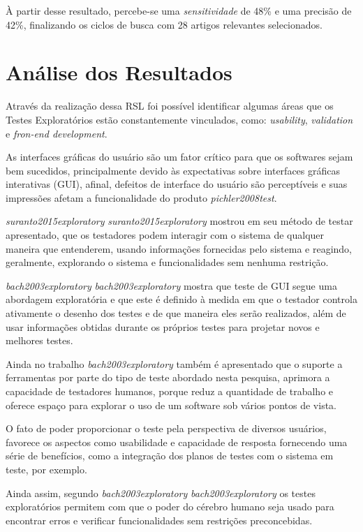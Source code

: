 À partir desse resultado, percebe-se uma \textit{sensitividade} de 48\% e uma precisão de 42\%, finalizando os ciclos de busca com 28 artigos relevantes selecionados.  

\section{Análise dos Resultados}

Através da realização dessa RSL foi possível identificar algumas áreas que os Testes Exploratórios estão constantemente vinculados, como: \textit{usability}, \textit{validation} e \textit{fron-end development}. 

As interfaces gráficas do usuário são um fator crítico para que os softwares sejam bem sucedidos, principalmente devido às expectativas sobre interfaces gráficas interativas (GUI), afinal, defeitos de interface do usuário são perceptíveis e suas impressões afetam a funcionalidade do produto \textit{pichler2008test}.

\textit{suranto2015exploratory} \textit{suranto2015exploratory} mostrou em seu método de testar apresentado, que os testadores podem interagir com o sistema de qualquer maneira que entenderem, usando informações fornecidas pelo sistema e reagindo, geralmente, explorando o sistema e funcionalidades sem nenhuma restrição. 

\textit{bach2003exploratory} \textit{bach2003exploratory} mostra que teste de GUI segue uma abordagem exploratória e que este é definido à medida em que o testador controla ativamente o desenho dos testes e de que maneira eles serão realizados, além de usar informações obtidas durante os próprios testes para projetar novos e melhores testes. 

Ainda no trabalho \textit{bach2003exploratory} também é apresentado que o suporte a ferramentas por parte do tipo de teste abordado nesta pesquisa, aprimora a capacidade de testadores humanos, porque reduz a quantidade de trabalho e oferece espaço para explorar o uso de um software sob vários pontos de vista. 

O fato de poder proporcionar o teste pela perspectiva de diversos usuários, favorece os aspectos como usabilidade e capacidade de resposta fornecendo uma série de benefícios, como a integração dos planos de testes com o sistema em teste, por exemplo. 

Ainda assim, segundo \textit{bach2003exploratory} \textit{bach2003exploratory} os testes exploratórios permitem com que o poder do cérebro humano seja usado para encontrar erros e verificar funcionalidades sem restrições preconcebidas. 

